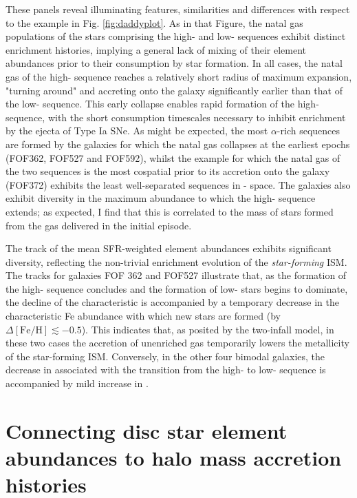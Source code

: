 These panels reveal illuminating features, similarities and differences with respect to the example in Fig. \ref{fig:daddyplot}. As in that Figure, the natal gas populations of the stars comprising the high- and low-\afe{} sequences exhibit distinct enrichment histories, implying a general lack of mixing of their element abundances prior to their consumption by star formation. In all cases, the natal gas of the high-\afe{} sequence reaches a relatively short radius of maximum expansion, "turning around" and accreting onto the galaxy significantly earlier than that of the low-\afe{} sequence. This early collapse enables rapid formation of the high-\afe{} sequence, with the short consumption timescales necessary to inhibit enrichment by the ejecta of Type Ia SNe. As might be expected, the most $\alpha$-rich sequences are formed by the galaxies for which the natal gas collapses at the earliest epochs (FOF362, FOF527 and FOF592), whilst the example for which the natal gas of the two sequences is the most cospatial prior to its accretion onto the galaxy (FOF372) exhibits the least well-separated sequences in \afe{}-\feh{} space. The galaxies also exhibit diversity in the maximum \feh{} abundance to which the high-\afe{} sequence extends; as expected, I find that this is correlated to the mass of stars formed from the gas delivered in the initial episode.

The track of the mean SFR-weighted element abundances exhibits significant diversity, reflecting the non-trivial enrichment evolution of the \emph{star-forming} ISM. The tracks for galaxies FOF 362 and FOF527 illustrate that, as the formation of the high-\afe{} sequence concludes and the formation of low-\afe{} stars begins to dominate, the decline of the characteristic \afe{} is accompanied by a temporary decrease in the characteristic Fe abundance with which new stars are formed (by $\Delta\mathrm{[Fe/H]}\lesssim -0.5$). This indicates that, as posited by the two-infall model, in these two cases the accretion of unenriched gas temporarily lowers the metallicity of the star-forming ISM. Conversely, in the other four bimodal galaxies, the decrease in \afe{} associated with the transition from the high- to low-\afe{} sequence is accompanied by mild increase in \feh{}. 

\section{Connecting disc star element abundances to halo mass accretion histories}
\label{sec:halo_accretion}

